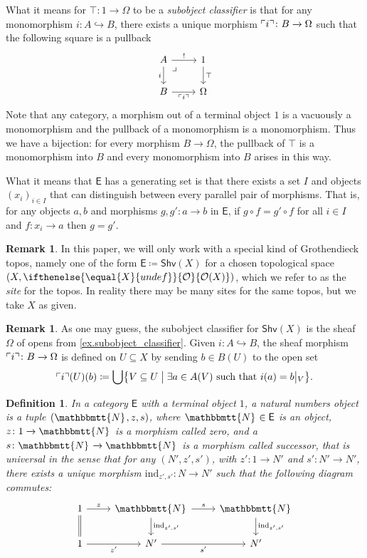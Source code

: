 \documentclass[reqno,11pt]{amsproc}
\theoremstyle{plain}
\newtheorem{definition}[theorem]{Definition}
\theoremstyle{definition}
\newtheorem{remark}[theorem]{Remark}
\DeclarePairedDelimiter{\classify}{\ulcorner}{\urcorner}
\newcommand{\cat}[1]{\mathsf{#1}}
\renewcommand{\to}[1][]{\xrightarrow{#1}}
\newcommand{\inj}{\hookrightarrow}
\newcommand{\tn}[1]{\textnormal{#1}}
\newcommand{\internal}[1]{\raisebox{-.03ex}{$\mathbbmtt{#1}$}}
\newcommand{\hs}{\hspace{1pt}}
\newcommand{\tnn}{\internal{N}\hs}
\newcommand{\shv}{\cat{Shv}}
\newcommand{\Op}[1][undef]{\ifthenelse{\equal{#1}{undef}}{\mathcal{O}}{\mathcal{O}(#1)}}
\newcommand{\rest}[2]{#1\big|\hspace{0in}_{#2}}
\let\originalleft\left
\let\originalright\right
\renewcommand{\left}{\mathopen{}\mathclose\bgroup\originalleft}
\renewcommand{\right}{\aftergroup\egroup\originalright}
\numberwithin{equation}{section}
\begin{document}
 What it means for $\top\colon 1\to \Omega$ to be a \emph{subobject classifier} is that for any monomorphism $i\colon A\inj B$, there exists a unique morphism $\classify{i}\colon B\to\Omega$ such that the following square is a pullback
\begin{equation}\label{eqn.subobject_classifier}
\begin{tikzcd}
	A\ar[r, "!"]\ar[d, "i"']&
	1\ar[d, "\top"]\\
	B\ar[r, "\classify{i}"']&
	\Omega\ar[ul, phantom, very near end, "\lrcorner"]
\end{tikzcd}
\end{equation}
Note that any category, a morphism out of a terminal object $1$ is a vacuously a monomorphism and the pullback of a monomorphism is a monomorphism. Thus we have a bijection: for every morphism $B\to \Omega$, the pullback of $\top$ is a monomorphism into $B$ and every monomorphism into $B$ arises in this way.

What it means that $\cat{E}$ has a generating set is that there exists a set $I$ and objects $(x_i)_{i\in I}$ that can distinguish between every parallel pair of morphisms. That is, for any objects $a,b$ and morphisms $g,g'\colon a\to b$ in $\cat{E}$, if $g\circ f=g'\circ f$ for all $i\in I$ and $f\colon x_i\to a$ then $g=g'$.

\begin{remark}
In this paper, we will only work with a special kind of Grothendieck topos, namely one of the form $\cat{E}\coloneqq\shv(X)$ for a chosen topological space $(X,\Op[X])$, which we refer to as the \emph{site} for the topos. In reality there may be many sites for the same topos, but we take $X$ as given.
\end{remark}

\begin{remark}
As one may guess, the subobject classifier for $\shv(X)$ is the sheaf $\Omega$ of opens from \cref{ex.subobject_classifier}. Given $i\colon A\inj B$, the sheaf morphism $\classify{i}\colon B\to\Omega$ is defined on $U\subseteq X$ by sending $b\in B(U)$ to the open set
\[
	\classify{i}(U)(b)\coloneqq
	\bigcup\left\{V\subseteq U\;\middle|\;\exists a\in A(V) \tn{ such that } i(a)=\rest{b}{V}\right\}.
\]
\end{remark}

\begin{definition}
In a category $\cat{E}$ with a terminal object $1$, a \emph{natural numbers object} is a tuple $(\tnn,z,s)$, where $\tnn\in\cat{E}$ is an object, $z\colon 1\to\tnn$ is a morphism called \emph{zero}, and a $s\colon \tnn\to \tnn$ is a morphism called \emph{successor}, that is universal in the sense that for any $(N',z',s')$, with $z'\colon 1\to N'$ and $s'\colon N'\to N'$, there exists a unique morphism $\mathrm{ind}_{z',s'}\colon N\to N'$ such that the following diagram commutes:
\[
\begin{tikzcd}
	1\ar[r, "z"]\ar[d, equal]&
	\tnn\ar[r, "s"]\ar[d, "\mathrm{ind}_{z',s'}"]&
	\tnn\ar[d, "\mathrm{ind}_{z',s'}"]\\
	1\ar[r, "z'"']&
	N'\ar[r, "s'"']&
	N'
\end{tikzcd}
\]
\end{definition}
\end{document}

